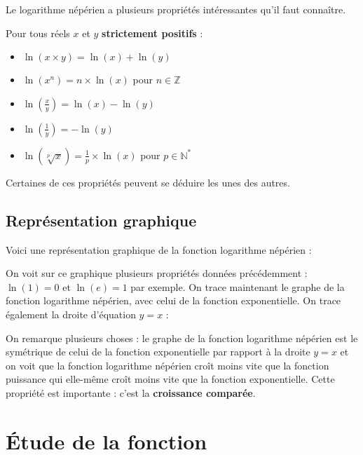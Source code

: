 	Le logarithme népérien a plusieurs propriétés intéressantes qu'il faut connaître.
	
	\begin{formula}[Formules]
		Pour tous réels $x$ et $y$ \textbf{strictement positifs} :
		\begin{itemize}
			\item $\ln(x \times y) = \ln(x) + \ln(y)$
			\item $\ln(x^n) = n \times \ln(x)$ pour $n \in \mathbb{Z}$
			\item $\displaystyle{\ln\left(\frac{x}{y}\right) = \ln(x) - \ln(y)}$
			\item $\displaystyle{\ln\left(\frac{1}{y}\right) = -\ln(y)}$
			\item $\displaystyle{\ln(\sqrt[p]{x}) = \frac{1}{p} \times \ln(x)}$ pour $p \in \mathbb{N}^*$
		\end{itemize}
	\end{formula}
	
	Certaines de ces propriétés peuvent se déduire les unes des autres.
	
	\subsection{Représentation graphique}
	\label{representation-graphique}
	
	Voici une représentation graphique de la fonction logarithme népérien :
	
	
	On voit sur ce graphique plusieurs propriétés données précédemment : $\ln(1) = 0$ et $\ln(e) = 1$ par exemple.
	On trace maintenant le graphe de la fonction logarithme népérien, avec celui de la fonction exponentielle. On trace également la droite d'équation $y = x$ :
	
	
	On remarque plusieurs choses : le graphe de la fonction logarithme népérien est le symétrique de celui de la fonction exponentielle par rapport à la
	droite $y = x$ et on voit que la fonction logarithme népérien croît moins vite que la fonction puissance qui elle-même croît moins vite que la fonction exponentielle. Cette propriété est importante : c'est la \textbf{croissance comparée}.
	
	\section{Étude de la fonction}
	
